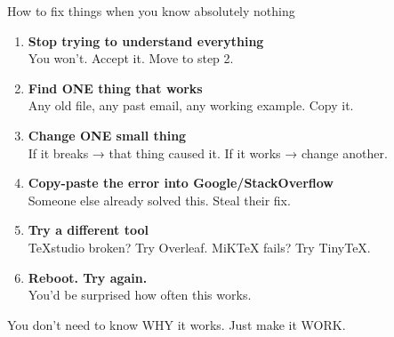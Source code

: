 \documentclass[aspectratio=169, 11pt]{beamer}
\begin{document}
	\begin{frame}{How to fix things when you know absolutely nothing}
		\begin{enumerate}
			\item \textbf{Stop trying to understand everything} \\
			\small{You won't. Accept it. Move to step 2.}
			
			\item \textbf{Find ONE thing that works} \\
			\small{Any old file, any past email, any working example. Copy it.}
			
			\item \textbf{Change ONE small thing} \\
			\small{If it breaks → that thing caused it. If it works → change another.}
			
			\item \textbf{Copy-paste the error into Google/StackOverflow} \\
			\small{Someone else already solved this. Steal their fix.}
			
			\item \textbf{Try a different tool} \\
			\small{TeXstudio broken? Try Overleaf. MiKTeX fails? Try TinyTeX.}
			
			\item \textbf{Reboot. Try again.} \\
			\small{You'd be surprised how often this works.}
		\end{enumerate}
		\vspace{0.2cm}
		\alert{You don't need to know WHY it works. Just make it WORK.}
	\end{frame}
	
\end{document}
